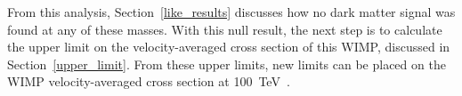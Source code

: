   From this analysis, Section~\ref{like_results} discusses how no dark matter signal was found at any of these masses.
  With this null result, the next step is to calculate the upper limit on the velocity-averaged cross section of this WIMP, discussed in Section~\ref{upper_limit}.
  From these upper limits, new limits can be placed on the WIMP velocity-averaged cross section at \SI{100}{\TeV{}}.


